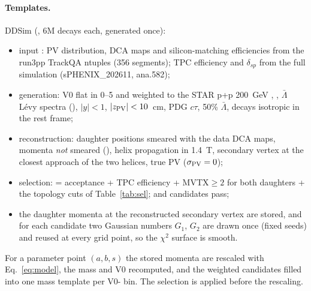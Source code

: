 \paragraph{Templates.} DDSim (, 6M decays each, generated once):
\begin{itemize}
\item input : PV distribution, DCA maps and silicon-matching efficiencies from the run3pp
  TrackQA ntuples (356 segments); TPC efficiency and $\delta_{sp}$ from the full simulation (sPHENIX\_202611, ana.582);
\item generation: V0 \pt{} flat in 0--5\gevc{} and weighted to the STAR p+p 200~GeV \Ks, \La, $\bar\Lambda$ L\'evy spectra
  (), $|y|<1$, $|z_{\rm PV}|<10$~cm, PDG $c\tau$, \La{} 50\% $\bar\Lambda$, decays isotropic in the rest frame;
\item reconstruction: daughter positions smeared with the data DCA maps, momenta \emph{not} smeared (),
  helix propagation in 1.4~T, secondary vertex at the closest approach of the two helices, true PV ($\sigma_{\rm PV}=0$);
\item selection:  = acceptance + TPC efficiency + MVTX$\geq2$ for both daughters + the topology cuts of
  Table~\ref{tab:sel}; \TmplKs{} \Ks{} and \TmplLa{} \La{} candidates pass;
\item the daughter momenta at the reconstructed secondary vertex are stored, and for each candidate two Gaussian numbers $G_1$,
  $G_2$ are drawn once (fixed seeds) and reused at every grid point, so the $\chi^2$ surface is smooth.
\end{itemize}
For a parameter point $(a,b,s)$ the stored momenta are rescaled with Eq.~\ref{eq:model}, the mass and V0 \pt{} recomputed, and
the weighted candidates filled into one mass template per V0-\pt{} bin. The selection is applied before the rescaling.


